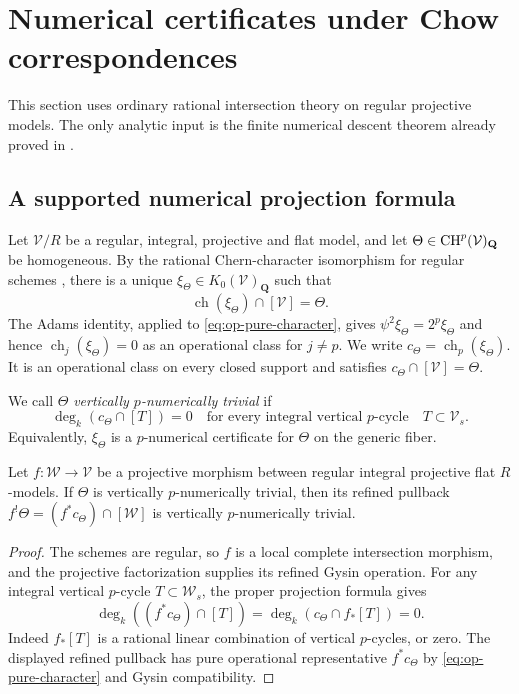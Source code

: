 \section{Numerical certificates under Chow correspondences}
\label{sec:correspondences}

This section uses ordinary rational intersection theory on regular
projective models.  The only analytic input is the finite numerical
descent theorem already proved in .

\subsection{A supported numerical projection formula}

Let $\mathcal V/R$ be a regular, integral, projective and flat model,
and let $\Theta\in\operatorname{CH}^p(\mathcal V)_{\mathbf Q}$ be homogeneous.
By the rational Chern-character isomorphism for regular schemes
\cite[Tag~0FEY]{StacksFEY}, there is a unique
$\xi_\Theta\in K_0(\mathcal V)_{\mathbf Q}$ such that
\begin{equation}\label{eq:op-pure-character}
       \operatorname{ch}(\xi_\Theta)\cap[\mathcal V]=\Theta.
\end{equation}
The Adams identity, applied to \eqref{eq:op-pure-character}, gives
$\psi^2\xi_\Theta=2^p\xi_\Theta$ and hence
$\operatorname{ch}_j(\xi_\Theta)=0$ as an operational class
for $j\ne p$.  We write
$c_\Theta=\operatorname{ch}_p(\xi_\Theta)$.  It is an
operational class on every closed support and satisfies
$c_\Theta\cap[\mathcal V]=\Theta$.

We call $\Theta$ \emph{vertically $p$-numerically trivial} if
\begin{equation}\label{eq:vertical-numerical-def}
 \deg_k(c_\Theta\cap[T])=0
 \quad\text{for every integral vertical $p$-cycle}
 \quad T\subset\mathcal V_s.
\end{equation}
Equivalently, $\xi_\Theta$ is a $p$-numerical certificate for
$\Theta$ on the generic fiber.

\begin{lemma}\label{lem:operational-pullback}
Let $f:\mathcal W\to\mathcal V$ be a projective morphism between
regular integral projective flat $R$-models.  If $\Theta$ is
vertically $p$-numerically trivial, then its refined pullback
$f^!\Theta=(f^*c_\Theta)\cap[\mathcal W]$ is vertically
$p$-numerically trivial.
\end{lemma}

\begin{proof}
The schemes are regular, so $f$ is a local complete intersection
morphism, and the projective factorization supplies its refined
Gysin operation.  For any integral vertical $p$-cycle
$T\subset\mathcal W_s$, the proper projection formula gives
\[
 \deg_k((f^*c_\Theta)\cap[T])
       =\deg_k(c_\Theta\cap f_*[T])=0.
\]
Indeed $f_*[T]$ is a rational linear combination of vertical
$p$-cycles, or zero.  The displayed refined pullback has pure
operational representative $f^*c_\Theta$ by
\eqref{eq:op-pure-character} and Gysin compatibility.
\end{proof}

